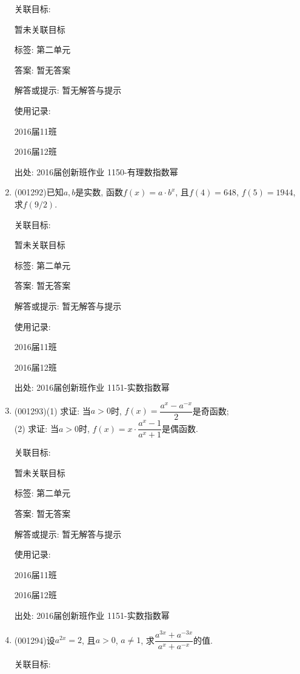 \documentclass[10pt,a4paper]{article}
\begin{document}
\begin{enumerate}[1.]
关联目标:

暂未关联目标



标签: 第二单元

答案: 暂无答案

解答或提示: 暂无解答与提示

使用记录:

2016届11班	

2016届12班	


出处: 2016届创新班作业	1150-有理数指数幂
\item { (001292)}已知$a,b$是实数, 函数$f(x)=a\cdot b^x$, 且$f(4)=648$, $f(5)=1944$, 求$f(9/2)$.


关联目标:

暂未关联目标



标签: 第二单元

答案: 暂无答案

解答或提示: 暂无解答与提示

使用记录:

2016届11班	

2016届12班	


出处: 2016届创新班作业	1151-实数指数幂
\item { (001293)}(1) 求证: 当$a>0$时, $f(x)=\dfrac{a^x-a^{-x}}{2}$是奇函数;\\ 
(2) 求证: 当$a>0$时, $f(x)=x\cdot \dfrac{a^x-1}{a^x+1}$是偶函数.


关联目标:

暂未关联目标



标签: 第二单元

答案: 暂无答案

解答或提示: 暂无解答与提示

使用记录:

2016届11班		

2016届12班		


出处: 2016届创新班作业	1151-实数指数幂
\item { (001294)}设$a^{2x}=2$, 且$a>0$, $a \ne 1$, 求$\dfrac{a^{3x}+a^{-3x}}{a^x+a^{-x}}$的值.


关联目标:


\end{enumerate}
\end{document}
